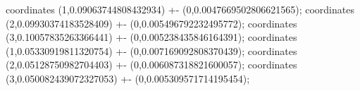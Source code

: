 coordinates {(1,0.09063744808432934) +- (0,0.0047669502806621565)};
coordinates {(2,0.09930374183528409) +- (0,0.005496792232495772)};
coordinates {(3,0.10057835263366441) +- (0,0.005238435846164391)};
coordinates {(1,0.05330919811320754) +- (0,0.007169092808370439)};
coordinates {(2,0.05128750982704403) +- (0,0.006087318821600057)};
coordinates {(3,0.050082439072327053) +- (0,0.005309571714195454)};
